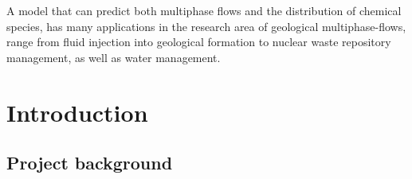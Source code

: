 \documentclass[12pt,a4paper,oneside]{report}%
\begin{document}
A model that can predict both multiphase flows and the distribution of chemical species, has many applications in the research area of geological multiphase-flows, range from fluid injection into geological formation to nuclear waste repository management, as well as water management.


\tableofcontents
\cleardoublepage


\chapter{Introduction}

\section{Project background}
\end{document}
